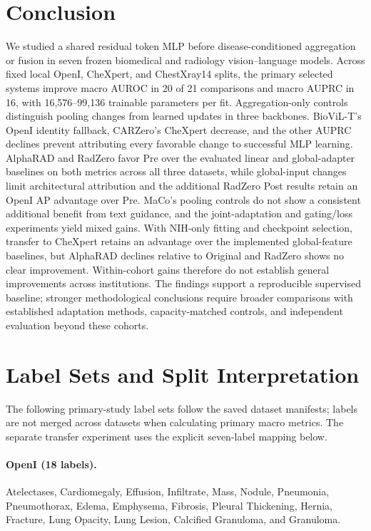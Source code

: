 \documentclass[10pt,twocolumn,letterpaper]{article}
\begin{document}
\section{Conclusion}
We studied a shared residual token MLP before disease-conditioned aggregation or fusion in seven frozen biomedical and radiology vision--language models. Across fixed local OpenI, CheXpert, and ChestXray14 splits, the primary selected systems improve macro AUROC in 20 of 21 comparisons and macro AUPRC in 16, with 16,576--99,136 trainable parameters per fit. Aggregation-only controls distinguish pooling changes from learned updates in three backbones. BioViL-T's OpenI identity fallback, CARZero's CheXpert decrease, and the other AUPRC declines prevent attributing every favorable change to successful MLP learning. AlphaRAD and RadZero favor Pre over the evaluated linear and global-adapter baselines on both metrics across all three datasets, while global-input changes limit architectural attribution and the additional RadZero Post results retain an OpenI AP advantage over Pre. MaCo's pooling controls do not show a consistent additional benefit from text guidance, and the joint-adaptation and gating/loss experiments yield mixed gains. With NIH-only fitting and checkpoint selection, transfer to CheXpert retains an advantage over the implemented global-feature baselines, but AlphaRAD declines relative to Original and RadZero shows no clear improvement. Within-cohort gains therefore do not establish general improvements across institutions. The findings support a reproducible supervised baseline; stronger methodological conclusions require broader comparisons with established adaptation methods, capacity-matched controls, and independent evaluation beyond these cohorts.

{\small


}

\clearpage
\appendix
\section{Label Sets and Split Interpretation}
\label{app:labels}
The following primary-study label sets follow the saved dataset manifests; labels are not merged across datasets when calculating primary macro metrics. The separate transfer experiment uses the explicit seven-label mapping below.

\paragraph{OpenI (18 labels).}
Atelectases, Cardiomegaly, Effusion, Infiltrate, Mass, Nodule, Pneumonia, Pneumothorax, Edema, Emphysema, Fibrosis, Pleural Thickening, Hernia, Fracture, Lung Opacity, Lung Lesion, Calcified Granuloma, and Granuloma.
\end{document}
